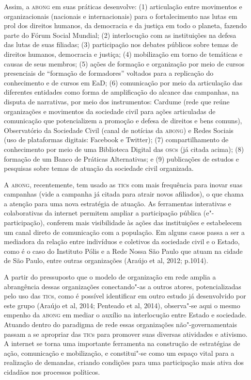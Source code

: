 Assim, a \textsc{abong} em suas práticas desenvolve: (1) articulação entre
movimentos e organizacionais (nacionais e internacionais) para o
fortalecimento nas lutas em prol dos direitos humanos, da democracia e
da justiça em todo o planeta, fazendo parte do Fórum Social Mundial; (2)
interlocução com as instituições na defesa das lutas de suas filiadas;
(3) participação nos debates públicos sobre temas de direitos humanos,
democracia e justiça; (4) mobilização em torno de temáticas e causas de
seus membros; (5) ações de formação e organização por meio de cursos
presenciais de ``formação de formadores'' voltados para a replicação do
conhecimento e de cursos em EaD; (6) comunicação por meio da articulação
das diferentes entidades como forma de amplificação do alcance das
campanhas, na disputa de narrativas, por meio dos instrumentos: Cardume
(rede que reúne organizações e movimentos da sociedade civil para ações
articuladas de comunicação que potencializem a promoção e defesa de
direitos e bens comuns), Observatório da Sociedade Civil (canal de
notícias da \textsc{abong}) e Redes Sociais (uso de plataformas digitais:
Facebook e Twitter); (7) compartilhamento de conhecimento por meio de
uma Biblioteca Digital das \textsc{osc}s (já citada acima); (8) formação de um
Banco de Práticas Alternativas; e (9) publicações de estudos e pesquisas
sobre temas de atuação da sociedade civil organizada.

A \textsc{abong}, recentemente, tem usado as \textsc{tic}s com mais frequência para inovar
suas campanhas (vide a campanha já citada para atrair novos afiliados),
o que chama a atenção para uma nova estratégia de atuação. As
ferramentas interativas e colaborativas da internet permitem ampliar a
participação pública (e"-participação), conferem mais visibilidade às
ações das instituições e estabelecem um canal direto de comunicação com
a população. Em alguns casos passa a ser a mediadora da relação entre
indivíduos e coletivos da sociedade civil e o Estado, como é o caso do
Instituto Pólis e a Rede Nossa São Paulo que atuam na cidade de São
Paulo, entre outras organizações (Araújo et al, 2012; p.1014).

A partir do pressuposto que o modelo de organização em rede amplia a
abrangência dessas organizações conectando"-as a outros atores,
potencializadas pelo uso das \textsc{tic}s, como é possível identificar em outro
estudo já desenvolvido por este grupo (Araújo et al, 2014; Penteado et
al, 2014), observa"-se aqui o mesmo empenho da \textsc{abong} em mediar o auxílio
na interlocução entre Estado e sociedade. Atuando dentro do paradigma de
rede essas organizações não"-governamentais passam a se apropriar das
\textsc{tic}s para promover suas diversas atividades e ativismo. A internet se
torna uma importante ferramenta na construção de estratégias de ação,
comunicação e mobilização, e constitui"-se como um espaço vital para a
realização de demandas, criando condições para uma participação mais
ativa dos cidadãos nos processos políticos.

